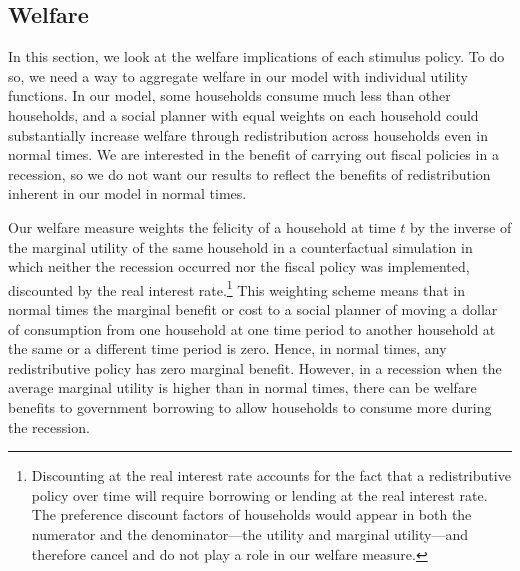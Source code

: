 \documentclass{econsocart}
\begin{document}
\subsection{Welfare}
\whenintegrated{\label{sec:welfare}} %

In this section, we look at the welfare implications of each stimulus policy.
To do so, we need a way to aggregate welfare in our model with individual utility functions.
In our model, some households consume much less than other households, and a social planner with equal weights on each household could substantially increase welfare through redistribution across households even in normal times.
We are interested in the benefit of carrying out fiscal policies in a recession, so we do not want our results to reflect the benefits of redistribution inherent in our model in normal times.

Our welfare measure weights the felicity of a household at time $t$ by the inverse of the marginal utility of the same household in a counterfactual simulation in which neither the recession occurred nor the fiscal policy was implemented, discounted by the real interest rate.\footnote{Discounting at the real interest rate accounts for the fact that a redistributive policy over time will require borrowing or lending at the real interest rate.
  The preference discount factors of households would appear in both the numerator and the denominator---the utility and marginal utility---and therefore cancel and do not play a role in our welfare measure.} This weighting scheme means that in normal times the marginal benefit or cost to a social planner of moving a dollar of consumption from one household at one time period to another household at the same or a different time period is zero.
Hence, in normal times, any redistributive policy has zero marginal benefit.
However, in a recession when the average marginal utility is higher than in normal times, there can be welfare benefits to government borrowing to allow households to consume more during the recession.
\end{document}
